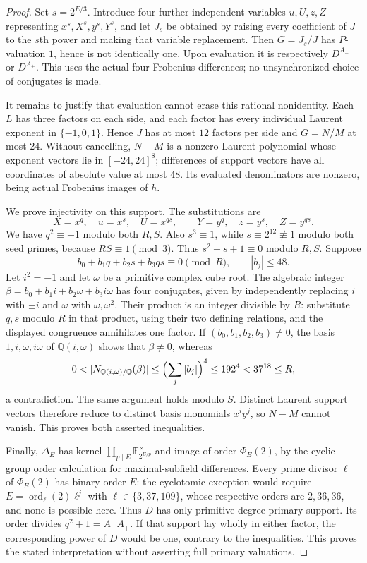 \documentclass[11pt]{article}
\theoremstyle{definition}
\theoremstyle{remark}
\begin{document}
\begin{proof}
Set $s=2^{E/3}$. Introduce four further independent variables
$u,U,z,Z$ representing $x^s,X^s,y^s,Y^s$, and let $J_s$ be obtained by
raising every coefficient of $J$ to the $s$th power and making that
variable replacement. Then $G=J_s/J$ has $P$-valuation $1$, hence is
not identically one. Upon evaluation it is respectively $D^{A_-}$ or
$D^{A_+}$. This uses the actual four Frobenius differences; no unsynchronized
choice of conjugates is made.

It remains to justify that evaluation cannot erase this rational
nonidentity. Each $L$ has three factors on each side, and each factor
has every individual Laurent exponent in $\{-1,0,1\}$. Hence $J$ has
at most $12$ factors per side and $G=N/M$ at most $24$. Without cancelling,
$N-M$ is a nonzero Laurent polynomial whose exponent vectors lie in
$[-24,24]^8$; differences of support vectors have all coordinates of
absolute value at most $48$. Its evaluated denominators are nonzero,
being actual Frobenius images of $h$.

We prove injectivity on this support. The substitutions are
\[
 X=x^q,\quad u=x^s,\quad U=x^{qs},\qquad
 Y=y^q,\quad z=y^s,\quad Z=y^{qs}.
\]
We have $q^2\equiv-1$ modulo both $R,S$. Also $s^3\equiv1$, while
$s\equiv2^{12}\not\equiv1$ modulo both seed primes, because
$RS\equiv1\pmod3$. Thus $s^2+s+1\equiv0$ modulo $R,S$.
Suppose
\[
 b_0+b_1q+b_2s+b_3qs\equiv0\pmod R,\qquad |b_j|\leq48.
\]
Let $i^2=-1$ and let $\omega$ be a primitive complex cube root.
The algebraic integer
$\beta=b_0+b_1i+b_2\omega+b_3i\omega$ has four conjugates, given
by independently replacing $i$ with $\pm i$ and $\omega$ with
$\omega,\omega^2$. Their product is an integer divisible by $R$:
substitute $q,s$ modulo $R$ in that product, using their two defining
relations, and the displayed congruence annihilates one factor.
If $(b_0,b_1,b_2,b_3)\ne0$, the basis
$1,i,\omega,i\omega$ of $\mathbb Q(i,\omega)$ shows that $\beta\ne0$, whereas
\[
 0<|N_{\mathbb Q(i,\omega)/\mathbb Q}(\beta)|
 \leq\Bigl(\sum_j|b_j|\Bigr)^4\leq192^4<37^{18}\leq R,
\]
a contradiction. The same argument holds modulo $S$. Distinct Laurent
support vectors therefore reduce to distinct basis monomials $x^i y^j$,
so $N-M$ cannot vanish. This proves both asserted inequalities.

Finally, $\Delta_E$ has kernel
$\prod_{p\mid E}\mathbb F_{2^{E/p}}^\times$ and image of order $\Phi_E(2)$,
by the cyclic-group order calculation for maximal-subfield differences.
Every prime divisor $\ell$ of $\Phi_E(2)$ has binary order $E$: the
cyclotomic exception would require
$E=\operatorname{ord}_\ell(2)\ell^j$ with $\ell\in\{3,37,109\}$, whose respective
orders are $2,36,36$, and none is possible here. Thus $D$ has only
primitive-degree primary support. Its order divides $q^2+1=A_-A_+$.
If that support lay wholly in either factor, the corresponding power
of $D$ would be one, contrary to the inequalities. This proves the
stated interpretation without asserting full primary valuations.
\end{proof}
\end{document}

